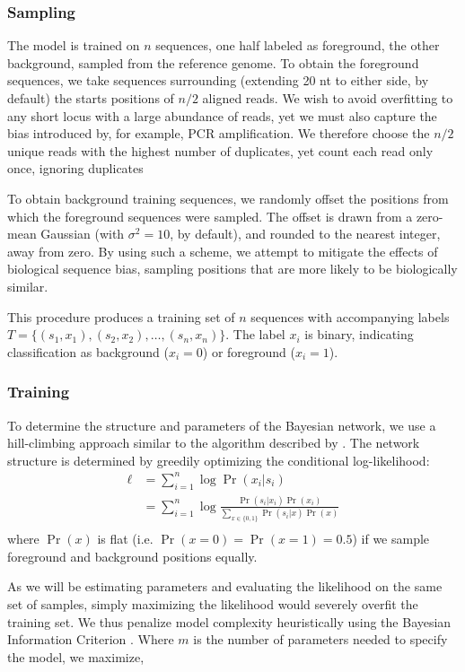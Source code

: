 \documentclass{bioinfo}
\begin{document}
\subsubsection{Sampling}

The model is trained on $n$ sequences, one half labeled as foreground, the other
background, sampled from the reference genome. To obtain the foreground
sequences, we take sequences surrounding (extending 20 nt to either side, by
default) the starts positions of $n/2$ aligned reads. We wish to avoid
overfitting to any short locus with a large abundance of reads, yet we must also
capture the bias introduced by, for example, PCR amplification. We therefore
choose the $n/2$ unique reads with the highest number of duplicates, yet count
each read only once, ignoring duplicates

To obtain background training sequences, we randomly offset the positions from
which the foreground sequences were sampled.  The offset is drawn from a
zero-mean Gaussian (with $\sigma^2 = 10$, by default), and rounded to the
nearest integer, away from zero.  By using such a scheme, we attempt to mitigate
the effects of biological sequence bias, sampling positions that are more likely
to be biologically similar.

This procedure produces a training set of $n$ sequences with accompanying labels
$T = \{ (s_1, x_1), (s_2, x_2), \dots, (s_n, x_n) \}$. The label $x_i$ is
binary, indicating classification as background ($x_i = 0$) or foreground ($x_i
= 1$).

\subsubsection{Training}


To determine the structure and parameters of the Bayesian network, we use a
hill-climbing approach similar to the algorithm described by \citet{Grossman2004}.
The network structure is determined by greedily optimizing the conditional
log-likelihood:
\begin{align*}
\ell &= \sum_{i=1}^{n} \log \Pr( x_i | s_i ) \\
&=
\sum_{i=1}^{n} \log \frac{ \Pr(s_i | x_i) \Pr( x_i ) }{
\sum_{x \in \{0,1\}} \Pr( s_i | x ) \Pr(x) } \\
\end{align*}
where $\Pr(x)$ is flat (i.e.  $\Pr( x = 0 ) = \Pr( x = 1 ) =
0.5$) if we sample foreground and background positions equally.

As we will be estimating parameters and evaluating the likelihood on the same
set of samples, simply maximizing the likelihood would severely overfit the
training set. We thus penalize model complexity heuristically using the Bayesian
Information Criterion \citep{Schwarz1978a}. Where $m$ is the number of
parameters needed to specify the model, we maximize, 
\end{document}
